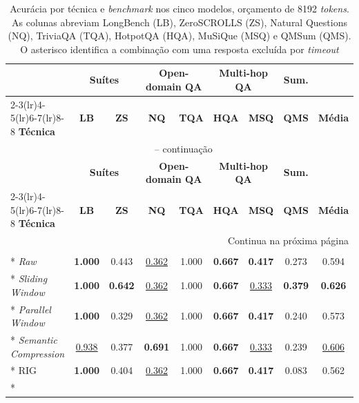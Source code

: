 {
\footnotesize
\setlength{\tabcolsep}{3pt}
\begin{longtable}{lcc|cc|cc|c|c}
\caption{Acurácia por técnica e \textit{benchmark} nos cinco modelos, orçamento de 8192 \textit{tokens}. As colunas abreviam LongBench (LB), ZeroSCROLLS (ZS), Natural Questions (NQ), TriviaQA (TQA), HotpotQA (HQA), MuSiQue (MSQ) e QMSum (QMS). O asterisco identifica a combinação com uma resposta excluída por \textit{timeout}}
\label{tab:acuracia-atual-8k} \\
\toprule
& \multicolumn{2}{c|}{\textbf{Suítes}} & \multicolumn{2}{c|}{\textbf{Open-domain QA}} & \multicolumn{2}{c|}{\textbf{Multi-hop QA}} & \multicolumn{1}{c|}{\textbf{Sum.}} & \\
\cmidrule(lr){2-3}\cmidrule(lr){4-5}\cmidrule(lr){6-7}\cmidrule(lr){8-8}
\textbf{Técnica} & \textbf{LB} & \textbf{ZS} & \textbf{NQ} & \textbf{TQA} & \textbf{HQA} & \textbf{MSQ} & \textbf{QMS} & \textbf{Média} \\
\midrule
\endfirsthead
\multicolumn{9}{c}{\tablename\ \thetable{} -- continuação} \\
\toprule
& \multicolumn{2}{c|}{\textbf{Suítes}} & \multicolumn{2}{c|}{\textbf{Open-domain QA}} & \multicolumn{2}{c|}{\textbf{Multi-hop QA}} & \multicolumn{1}{c|}{\textbf{Sum.}} & \\
\cmidrule(lr){2-3}\cmidrule(lr){4-5}\cmidrule(lr){6-7}\cmidrule(lr){8-8}
\textbf{Técnica} & \textbf{LB} & \textbf{ZS} & \textbf{NQ} & \textbf{TQA} & \textbf{HQA} & \textbf{MSQ} & \textbf{QMS} & \textbf{Média} \\
\midrule
\endhead
\midrule
\multicolumn{9}{r}{Continua na próxima página} \\
\endfoot
\bottomrule
\endlastfoot
\multicolumn{9}{l}{\textit{Llama 3.1 8B}} \\*
\textit{Raw}                   & \textbf{1.000} & 0.443 & \underline{0.362} & 1.000 & \textbf{0.667} & \textbf{0.417} & 0.273 & 0.594 \\*
\textit{Sliding Window}        & \textbf{1.000} & \textbf{0.642} & \underline{0.362} & 1.000 & \textbf{0.667} & \underline{0.333} & \textbf{0.379} & \textbf{0.626} \\*
\textit{Parallel Window}       & \textbf{1.000} & 0.329 & \underline{0.362} & 1.000 & \textbf{0.667} & \textbf{0.417} & 0.240 & 0.573 \\*
\textit{Semantic Compression}  & \underline{0.938} & 0.377 & \textbf{0.691} & 1.000 & \textbf{0.667} & \underline{0.333} & 0.239 & \underline{0.606} \\*
RIG                            & \textbf{1.000} & 0.404 & \underline{0.362} & 1.000 & \textbf{0.667} & \textbf{0.417} & 0.083 & 0.562 \\*

\end{longtable}}
